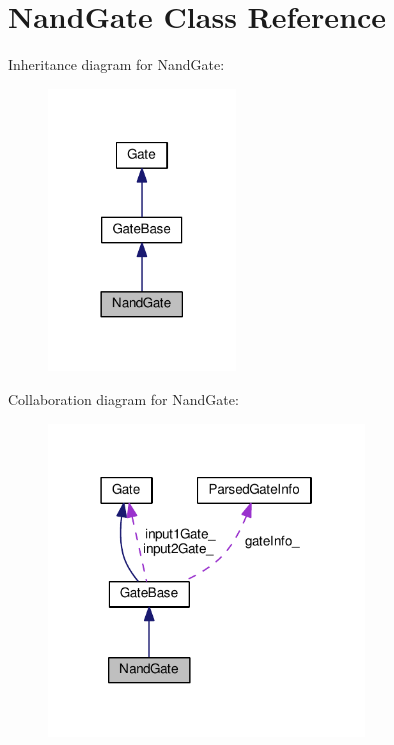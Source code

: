 \hypertarget{classNandGate}{}\section{Nand\+Gate Class Reference}
\label{classNandGate}


Inheritance diagram for Nand\+Gate\+:
\nopagebreak
\begin{figure}[H]
\begin{center}
\leavevmode
\includegraphics[width=141pt]{classNandGate__inherit__graph}
\end{center}
\end{figure}


Collaboration diagram for Nand\+Gate\+:
\nopagebreak
\begin{figure}[H]
\begin{center}
\leavevmode
\includegraphics[width=238pt]{classNandGate__coll__graph}
\end{center}
\end{figure}
